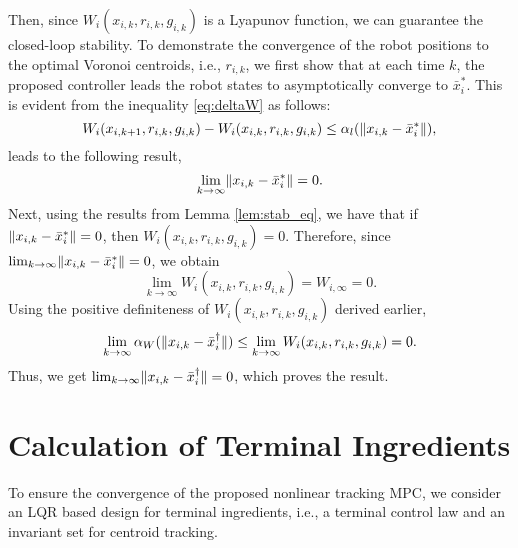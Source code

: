 Then, since $W_i(x_{i,k}, r_{i,k}, g_{i,k})$ is a Lyapunov function, we can guarantee the closed-loop stability.
To demonstrate the convergence of the robot positions to the optimal Voronoi centroids, i.e.,  $r_{i,k}$, we first show that at each time $k$, the proposed controller leads the robot states to asymptotically converge to $\bar{x}_i^*$. This is evident from the inequality \eqref{eq:deltaW} as follows:
\begin{equation*}
    W_i(x_{i,k+1}, r_{i,k}, g_{i,k}) - W_i(x_{i,k}, r_{i,k}, g_{i,k}) \leq\alpha_l(\lVert x_{i,k} - \bar{x}_i^*\rVert),
\end{equation*}
leads to the following result,
\begin{equation}
    \lim_{k\rightarrow\infty}\lVert x_{i,k} - \bar{x}_i^*\rVert = 0.
\end{equation}
Next, using the results from Lemma \ref{lem:stab_eq}, we have that if $\lVert x_{i,k} - \bar{x}_i^*\rVert=0$, then $W_i(x_{i,k}, r_{i,k}, g_{i,k}) =0$. Therefore, since $\lim_{k\rightarrow\infty}\lVert x_{i,k} - \bar{x}_i^*\rVert = 0$, we obtain
\begin{equation}
    \lim_{k\rightarrow\infty}W_i(x_{i,k}, r_{i,k}, g_{i,k}) = W_{i,\infty} = 0.
\end{equation}
Using the positive definiteness of $W_i(x_{i,k}, r_{i,k}, g_{i,k})$ derived earlier, 
\begin{equation*}
    \lim_{k\rightarrow\infty}\alpha_W(\lVert x_{i,k} - \bar{x}_i^\dagger\rVert) \leq \lim_{k\rightarrow\infty}W_i(x_{i,k}, r_{i,k}, g_{i,k}) = 0.
\end{equation*}
Thus, we get $ \lim_{k\rightarrow\infty}\lVert x_{i,k} - \bar{x}_i^\dagger\rVert= 0$, which proves the result.
\section{Calculation of Terminal Ingredients}
\label{app:terminal}
To ensure the convergence of the proposed nonlinear tracking MPC, we consider an LQR based design \cite{carron2020model,chen1998quasi} for terminal ingredients, i.e., a terminal control law and an invariant set for centroid tracking.
